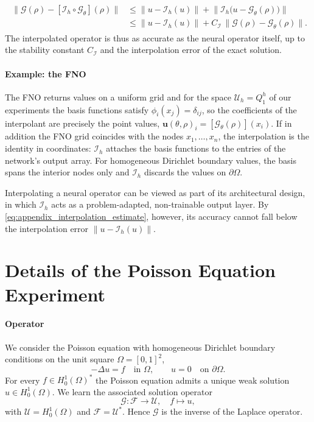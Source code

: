 \documentclass{article} %
\begin{document}
\begin{align}\label{eq:appendix_interpolation_estimate}
   \begin{split}
      \big\| \mathcal G(\rho) - [\mathcal I_h\circ\mathcal G_\theta](\rho) \big\|
      &\leq
      \big\| u - \mathcal I_h(u) \big\|
      +
      \big\| \mathcal I_h\big(u - \mathcal G_\theta(\rho)\big) \big\|
      \\
      &\leq
      \big\| u - \mathcal I_h(u) \big\|
      +
      C_{\mathcal I}\,\big\| \mathcal G(\rho) - \mathcal G_\theta(\rho) \big\|.
   \end{split}
\end{align}
The interpolated operator is thus as accurate as the neural operator itself, up to the stability constant $C_{\mathcal I}$ and the interpolation error of the exact solution.

\paragraph{Example: the FNO} The FNO returns values on a uniform grid and for the space $\mathcal U_h = Q_1^h$ of our experiments the basis functions satisfy $\phi_i(x_j) = \delta_{ij}$, so the coefficients of the interpolant are precisely the point values, $\mathbf u(\theta,\rho)_i = [\mathcal G_\theta(\rho)](x_i)$. If in addition the FNO grid coincides with the nodes $x_1,\dots,x_n$, the interpolation is the identity in coordinates: $\mathcal I_h$ attaches the basis functions to the entries of the network's output array. For homogeneous Dirichlet boundary values, the basis spans the interior nodes only and $\mathcal I_h$ discards the values on $\partial\Omega$.


Interpolating a neural operator can be viewed as part of its architectural design, in which $\mathcal I_h$ acts as a problem-adapted, non-trainable output layer. By \eqref{eq:appendix_interpolation_estimate}, however, its accuracy cannot fall below the interpolation error $\| u - \mathcal I_h(u) \|$.

\section{Details of the Poisson Equation Experiment}\label{appendix:details_poisson}

\paragraph{Operator} We consider the Poisson equation with homogeneous Dirichlet boundary conditions on the unit square $\Omega = [0,1]^2$,
\begin{equation}\label{eq:appendix_poisson}
   -\Delta u = f \quad \text{in } \Omega, \qquad u = 0 \quad \text{on } \partial\Omega.
\end{equation}
For every $f\in H^{1}_0(\Omega)^*$ the Poisson equation admits a unique weak solution $u\in H^1_0(\Omega)$. We learn the associated solution operator 
\begin{equation*}
   \mathcal G: \mathcal F \to \mathcal U, \quad f \mapsto u,
\end{equation*}
with $\mathcal U = H^1_0(\Omega)$ and $\mathcal F=\mathcal U^*$. Hence $\mathcal G$ is the inverse of the Laplace operator.
\end{document}
